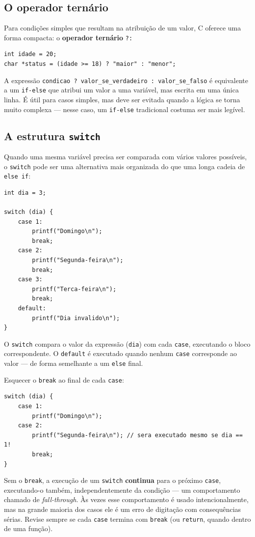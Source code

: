 \documentclass[12pt,a4paper,oneside]{extreport}
\begin{document}
\subsection{O operador ternário}

Para condições simples que resultam na atribuição de um valor, C oferece uma forma compacta: o \textbf{operador ternário} \texttt{?:}

\begin{lstlisting}
int idade = 20;
char *status = (idade >= 18) ? "maior" : "menor";
\end{lstlisting}

A expressão \texttt{condicao ? valor\_se\_verdadeiro : valor\_se\_falso} é equivalente a um \texttt{if-else} que atribui um valor a uma variável, mas escrita em uma única linha. É útil para casos simples, mas deve ser evitada quando a lógica se torna muito complexa — nesse caso, um \texttt{if-else} tradicional costuma ser mais legível.

\subsection{A estrutura \texttt{switch}}

Quando uma mesma variável precisa ser comparada com vários valores possíveis, o \texttt{switch} pode ser uma alternativa mais organizada do que uma longa cadeia de \texttt{else if}:

\begin{lstlisting}
int dia = 3;

switch (dia) {
    case 1:
        printf("Domingo\n");
        break;
    case 2:
        printf("Segunda-feira\n");
        break;
    case 3:
        printf("Terca-feira\n");
        break;
    default:
        printf("Dia invalido\n");
}
\end{lstlisting}

O \texttt{switch} compara o valor da expressão (\texttt{dia}) com cada \texttt{case}, executando o bloco correspondente. O \texttt{default} é executado quando nenhum \texttt{case} corresponde ao valor — de forma semelhante a um \texttt{else} final.

\begin{errocomum}
Esquecer o \texttt{break} ao final de cada \texttt{case}:
\begin{lstlisting}
switch (dia) {
    case 1:
        printf("Domingo\n");
    case 2:
        printf("Segunda-feira\n"); // sera executado mesmo se dia == 1!
        break;
}
\end{lstlisting}
Sem o \texttt{break}, a execução de um \texttt{switch} \textbf{continua} para o próximo \texttt{case}, executando-o também, independentemente da condição — um comportamento chamado de \textit{fall-through}. Às vezes esse comportamento é usado intencionalmente, mas na grande maioria dos casos ele é um erro de digitação com consequências sérias. Revise sempre se cada \texttt{case} termina com \texttt{break} (ou \texttt{return}, quando dentro de uma função).
\end{errocomum}
\end{document}
